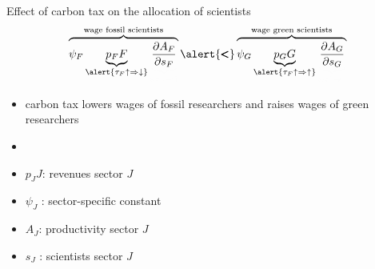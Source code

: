 \documentclass[11pt,aspectratio=169]{beamer}
\begin{document}
\addtocounter{framenumber}{-1}

\begin{frame}{Effect of carbon tax on the allocation of scientists}
	\vspace{0mm}
	\large
	\begin{align*}
		\color{black}
				\overbrace{{\psi_F} \underbrace{p_F{F}}_{{\alert{\tau_F\uparrow\Rightarrow\downarrow}}}\textcolor{black!1}{\underbrace{\textcolor{black}{\frac{\partial A_{F}}{\partial s_{F}}}}_{{{s_F\downarrow\Rightarrow\uparrow}}}}}^{\text{wage fossil scientists}}\alert{\pmb{<}}\overbrace{{\psi_G} \underbrace{p_G{G}}_{{\alert{\tau_F\uparrow\Rightarrow\uparrow}}}\textcolor{black!1}{\underbrace{\textcolor{black}{\frac{\partial A_{G}}{\partial s_{G}}}}_{	{{s_G\uparrow\Rightarrow\downarrow}}}}}^{\text{wage green scientists}}
	\end{align*}
	\normalsize
	\begin{itemize}
		\item carbon tax lowers wages of fossil researchers and raises wages of green researchers
		\vspace{2mm}
		\item[] \  %
	\end{itemize}
	\small
	\vspace{4mm}
	\hspace{-2mm}
	\begin{minipage}[t!]{0.4\textwidth}
		\vspace{0mm}
		\begin{itemize}
			\item[] $p_JJ$: revenues sector $J$
			\vspace{-2mm}
			\item[] $\psi_J$ : sector-specific constant
		\end{itemize}
	\end{minipage}
	\vspace{-5mm}
	\begin{minipage}[t!]{0.5\textwidth}
		\vspace{0mm}
		\begin{itemize}	
			\item[] $A_J$: productivity sector $J$
			\vspace{-2mm}			
			\item[] $s_J$ : scientists sector $J$
		\end{itemize}
	\end{minipage}
\end{frame}
\end{document}
